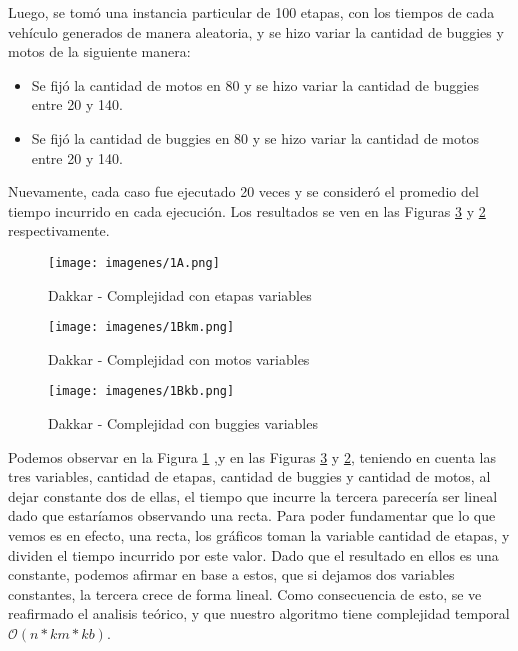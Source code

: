 Luego, se tomó una instancia particular de 100 etapas, con los tiempos de cada vehículo generados de manera aleatoria, y se hizo variar la cantidad de buggies y motos de la siguiente manera:

\begin{itemize}
	\item Se fijó la cantidad de motos en 80 y se hizo variar la cantidad de buggies entre 20 y 140.
	\item Se fijó la cantidad de buggies en 80 y se hizo variar la cantidad de motos entre 20 y 140.
\end{itemize}

Nuevamente, cada caso fue ejecutado 20 veces y se consideró el promedio del tiempo incurrido en cada ejecución.  Los resultados se ven en las Figuras \ref{fig:1Bkb} y \ref{fig:1Bkm} respectivamente.


\begin{figure}[htb]
	\begin{center}
    		\texttt{[image: imagenes/1A.png]}
	\end{center}
	\caption{Dakkar - Complejidad con etapas variables}\label{fig:1A}
\end{figure}

\begin{figure}[htb]
	\begin{center}
    		\texttt{[image: imagenes/1Bkm.png]}
	\end{center}
	\caption{Dakkar - Complejidad con motos variables}\label{fig:1Bkm}
\end{figure}

\begin{figure}[htb]
	\begin{center}
    		\texttt{[image: imagenes/1Bkb.png]}
	\end{center}
	\caption{Dakkar - Complejidad con buggies variables}\label{fig:1Bkb}
\end{figure}


Podemos observar en la Figura \ref{fig:1A} ,y en las Figuras \ref{fig:1Bkb} y \ref{fig:1Bkm}, teniendo en cuenta las tres variables, cantidad de etapas, cantidad de buggies y cantidad de motos, al dejar constante dos de ellas, el tiempo que incurre la tercera parecería ser lineal dado que estaríamos observando una recta. Para poder fundamentar que lo que vemos es en efecto, una recta, los gráficos toman la variable cantidad de etapas, y dividen el tiempo incurrido por este valor. Dado que el resultado en ellos es una constante, podemos afirmar en base a estos, que si dejamos dos variables constantes, la tercera crece de forma lineal. Como consecuencia de esto, se ve reafirmado el analisis teórico, y que nuestro algoritmo tiene complejidad temporal $\mathcal{O}(n*km*kb)$.

